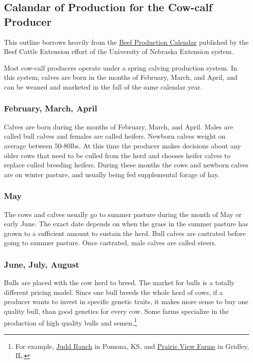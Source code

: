 \documentclass[
]{book}
\begin{document}
\hypertarget{calandar-of-production-for-the-cow-calf-producer}{%
\subsection{Calandar of Production for the Cow-calf Producer}\label{calandar-of-production-for-the-cow-calf-producer}}

This outline borrows heavily from the \href{http://beef.unl.edu/beefprodcal.shtml}{Beef Production Calendar} published by the Beef Cattle Extension effort of the University of Nebraska Extension system.

Most cow-calf producers operate under a spring calving production system. In this system, calves are born in the months of February, March, and April, and can be weaned and marketed in the fall of the same calendar year.

\hypertarget{february-march-april}{%
\subsubsection{February, March, April}\label{february-march-april}}

Calves are born during the months of February, March, and April. Males are called bull calves and females are called heifers. Newborn calves weight on average between 50-80lbs. At this time the producer makes decisions about any older cows that need to be culled from the herd and chooses heifer calves to replace culled breeding heifers. During these months the cows and newborn calves are on winter pasture, and usually being fed supplemental forage of hay.

\hypertarget{may}{%
\subsubsection{May}\label{may}}

The cows and calves usually go to summer pasture during the month of May or early June. The exact date depends on when the grass in the summer pasture has grown to a sufficient amount to sustain the herd. Bull calves are castrated before going to summer pasture. Once castrated, male calves are called steers.

\hypertarget{june-july-august}{%
\subsubsection{June, July, August}\label{june-july-august}}

Bulls are placed with the cow herd to breed. The market for bulls is a totally different pricing model. Since one bull breeds the whole herd of cows, if a producer wants to invest in specific genetic traits, it makes more sense to buy one quality bull, than good genetics for every cow. Some farms specialize in the production of high quality bulls and semen.\footnote{For example, \href{http://www.juddranch.com/}{Judd Ranch} in Pomona, KS, and \href{http://www.pvfangus.com/}{Prairie View Farms} in Gridley, IL.}
\end{document}
